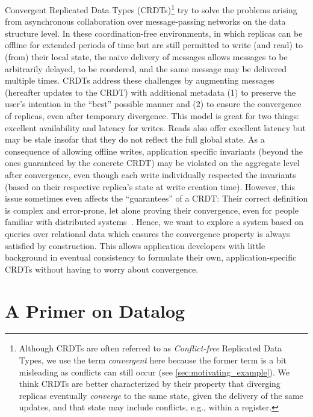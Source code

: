 \documentclass{article}
\begin{document}
Convergent Replicated Data Types (CRDTs)\footnote{
	Although CRDTs are often referred to as \emph{Conflict-free} Replicated
	Data Types, we use the term \emph{convergent} here because the former term
	is a bit misleading as conflicts can still occur
	(see \autoref{sec:motivating_example}).
	We think CRDTs are better characterized by their property that diverging
	replicas eventually \emph{converge} to the same state,
	given the delivery of the same updates,
	and that state may include conflicts, e.g., within a register.
} try to solve the problems arising from asynchronous collaboration over
message-passing networks on the data structure level.
In these coordination-free environments, in which replicas can be offline
for extended periods of time but are still permitted to write (and read)
to (from) their local state,
the naive delivery of messages allows messages to be arbitrarily delayed,
to be reordered, and the same message may be delivered multiple times.
CRDTs address these challenges by augmenting messages (hereafter updates
to the CRDT) with additional metadata (1) to preserve the user's intention
in the ``best'' possible manner and (2) to ensure the convergence of replicas,
even after temporary divergence.
This model is great for two things: excellent availability and latency for writes.
Reads also offer excellent latency but may be stale insofar that they do not
reflect the full global state.
As a consequence of allowing offline writes,
application specific invariants (beyond the ones guaranteed by the concrete CRDT)
may be violated on the aggregate level after convergence,
even though each write individually respected the invariants (based on their
respective replica's state at write creation time).
However, this issue sometimes even affects the ``guarantees'' of a CRDT:
Their correct definition is complex and error-prone,
let alone proving their convergence, even for people familiar with distributed
systems~\cite{kleppmann2022assessing, gomes2017verifying}.
Hence, we want to explore a system based on queries over relational data
which ensures the convergence property is always satisfied by construction.
This allows application developers with little background in eventual
consistency to formulate their own, application-specific CRDTs without
having to worry about convergence.

\section{A Primer on Datalog}
\label{sec:primer_datalog}
\end{document}
